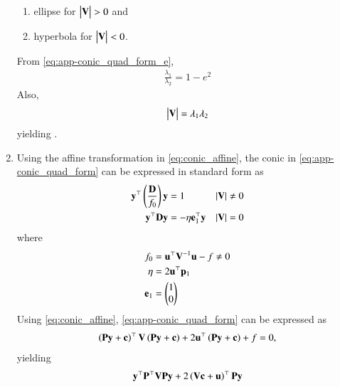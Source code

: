 \begin{enumerate}[label=\thesubsection.\arabic*.,ref=\thesubsection.\theenumi]
\begin{enumerate}
		\item ellipse for $\begin{vmatrix}\mathbf{V}\end{vmatrix} > 0 $ and 
		\item hyperbola for $\begin{vmatrix}\mathbf{V}\end{vmatrix} < 0 $.
	\end{enumerate}
\solution
  From \eqref{eq:app-conic_quad_form_e},
\begin{align}
  \frac{\lambda_1}{\lambda_2} = 1 - e^2
\end{align}
Also, 
\begin{align}
	\begin{vmatrix}\mathbf{V}\end{vmatrix} =   \lambda_1\lambda_2 
\end{align}
	yielding .
\begin{table}[H]
\centering
\resizebox{\columnwidth}{!}{%

	}
	\caption{}
\label{table:det}
\end{table}
			\item Using the affine transformation in
					\label{app:std-prm-P}
	\eqref{eq:conic_affine},
	the conic in     \eqref{eq:app-conic_quad_form} can be expressed in standard form 
	as
  \begin{align}
    \label{eq:app-conic_simp_temp_nonparab}
	    \mathbf{y}^{\top}\left(\frac{\mathbf{D}}{f_0}\right)\mathbf{y} &= 1   &  \left\vert\mathbf{V}\right\vert &\ne 0
    \\
	    \mathbf{y}^{\top}\mathbf{D}\mathbf{y} &=  -\eta\mathbf{e}_1^{\top}\mathbf{y}   & \left\vert\mathbf{V}\right\vert &= 0
    \label{eq:app-conic_simp_temp_parab}
    \end{align}
    where
  \begin{align}
      \label{eq:app-f0}
	  f_0 &=\mathbf{u}^{\top}\mathbf{V}^{-1}\mathbf{u} -f \ne 0
	  \\
      \label{eq:app-eta}
       \eta &=2\mathbf{u}^{\top}\mathbf{p}_1
       \\
       \mathbf{e}_1 &=\begin{pmatrix}1 \\ 0\end{pmatrix}
      \end{align}
      \solution
  \label{app:parab}
	Using 
\eqref{eq:conic_affine},
\eqref{eq:app-conic_quad_form} can be expressed as
\begin{align}
\left(\mathbf{P}\mathbf{y}+\mathbf{c}\right)^{\top}\mathbf{V}\left(\mathbf{P}\mathbf{y}+\mathbf{c}\right)+2\mathbf{u}^{\top}\left(\mathbf{P}\mathbf{y}+\mathbf{c}\right)+ f
	= 0, 
\end{align}
yielding 
\begin{align}
\vec{y}^{\top}\vec{P}^{\top}\vec{V}\vec{P}\vec{y}+2\brak{\vec{V}\vec{c}+\vec{u}}^{\top}\vec{P}\vec{y}

\end{align}
\end{enumerate}

